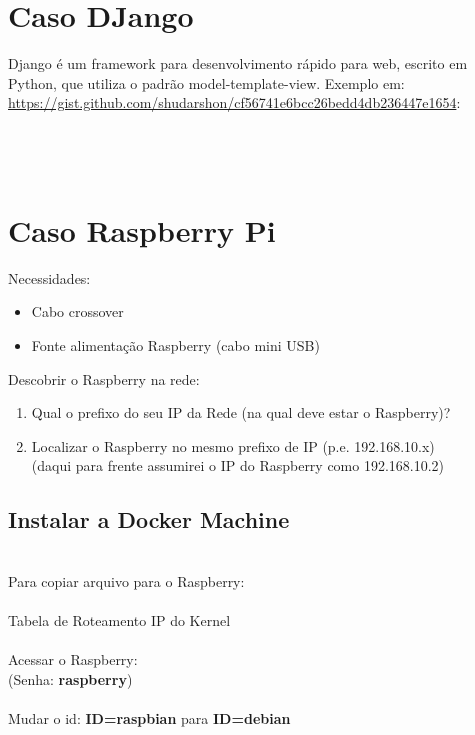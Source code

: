 \documentclass[a4paper,11pt]{article}
\begin{document}
\section{Caso DJango}
Django é um framework para desenvolvimento rápido para web, escrito em Python, que utiliza o padrão model-template-view. Exemplo em: \url{https://gist.github.com/shudarshon/cf56741e6bcc26bedd4db236447e1654}: \\
 \\
 \\
 \\

\section{Caso Raspberry Pi}
Necessidades:
\begin{itemize}[noitemsep]
	\item Cabo crossover
	\item Fonte alimentação Raspberry (cabo mini USB)
\end{itemize}
Descobrir o Raspberry na rede:
\begin{enumerate}
	\item Qual o prefixo do seu IP da Rede (na qual deve estar o Raspberry)? \\ 
	\item Localizar o Raspberry no mesmo prefixo de IP (p.e. 192.168.10.x) \\  (daqui para frente assumirei o IP do Raspberry como 192.168.10.2)
\end{enumerate}

\subsection{Instalar a Docker Machine}
 \\[2mm]
Para copiar arquivo para o Raspberry: \\
 \\[2mm]
Tabela de Roteamento IP do Kernel \\
 \\[2mm]
Acessar o Raspberry: \\
 (Senha: \textbf{raspberry}) \\
 \\
Mudar o id: \textbf{ID=raspbian} para \textbf{ID=debian} \\
 \\
 \\
\end{document}
